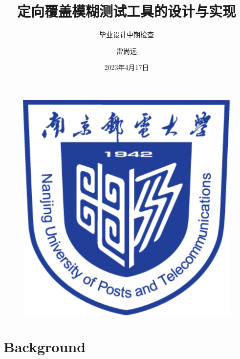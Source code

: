 \documentclass[10pt,aspectratio=43]{beamer}
\author{雷尚远}
\title{定向覆盖模糊测试工具的设计与实现}
\subtitle{毕业设计中期检查}
\institute{南京邮电大学计算机学院}
\date{2023年4月17日}
\begin{document}
\begin{frame}
    \titlepage
    \begin{figure}[htpb]
        \begin{center}
            \includegraphics[width=0.2\linewidth]{pic/NJUPT_Logo.pdf}
        \end{center}
    \end{figure}
\end{frame}

\begin{frame}
    \tableofcontents[sectionstyle=show,subsectionstyle=show/shaded/hide,subsubsectionstyle=show/shaded/hide]
\end{frame}


\section{Background}
\end{document}
